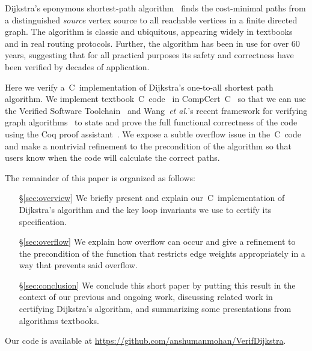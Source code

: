 Dijkstra's eponymous shortest-path algorithm~\cite{DBLP:journals/nm/Dijkstra59} finds
the cost-minimal paths from a distinguished \emph{source} vertex
source to all reachable vertices in a finite directed graph.
The algorithm is classic and ubiquitous, appearing widely in textbooks~\cite{clrs}
and in real routing protocols. Further, the algorithm has been in
use for over $60$ years, suggesting that for all practical purposes
its safety and correctness have been verified by decades of application.


Here we verify a~C~implementation of Dijkstra's one-to-all shortest path algorithm.
We implement textbook~C~code~\cite{clrs} in CompCert~C~\cite{leroy:compcert} so that
we can use the Verified Software Toolchain~\cite{appel:programlogics} and
Wang~\emph{et al.}'s recent framework for verifying graph algorithms~\cite{DBLP:journals/pacmpl/WangCMH19} to state and prove the full functional
correctness of the code using the Coq proof assistant~\cite{coq}.
We expose a subtle overflow issue in the~C~code and make a nontrivial refinement to the precondition of the algorithm so that users know when the code will calculate the correct paths.

The remainder of this paper is organized as follows:
\begin{itemize}
    \item[\S\ref{sec:overview}] We briefly present and explain
    our~C~implementation of Dijkstra's algorithm and the key loop invariants
    we use to certify its specification.
    \item[\S\ref{sec:overflow}] We explain how overflow can occur and give a
    refinement to the precondition of the function that restricts edge weights
    appropriately in a way that prevents said overflow.
    \item[\S\ref{sec:conclusion}] We conclude this short paper by putting this result in the context of our
    previous and ongoing work, discussing related work in certifying Dijkstra's algorithm, and summarizing some presentations from algorithms textbooks.
\end{itemize}

\noindent Our code is available at \url{https://github.com/anshumanmohan/VerifDijkstra}.
